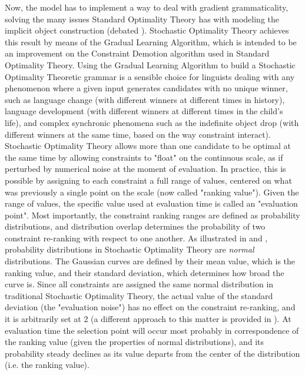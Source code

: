 Now, the model has to implement a way to deal with gradient grammaticality, solving the many issues Standard Optimality Theory has with modeling the implicit object construction (debated  ). Stochastic Optimality Theory achieves this result by means of the Gradual Learning Algorithm, which is intended to be an improvement on the Constraint Demotion algorithm \parencite{TesarSmolensky1993learnability} used in Standard Optimality Theory. Using the Gradual Learning Algorithm to build a Stochastic Optimality Theoretic grammar is a sensible choice for linguists dealing with any phenomenon where a given input generates candidates with no unique winner, such as language change (with different winners at different times in history), language development (with different winners at different times in the child's life), and complex synchronic phenomena such as the indefinite object drop (with different winners at the same time, based on the way constraint interact).\\
Stochastic Optimality Theory allows more than one candidate to be optimal at the same time by allowing constraints to "float" on the continuous scale, as if perturbed by numerical noise at the moment of evaluation. In practice, this is possible by assigning to each constraint a full range of values, centered on what was previously a single point on the scale (now called "ranking value"). Given the range of values, the specific value used at evaluation time is called an "evaluation point". Most importantly, the constraint ranking ranges are defined as probability distributions, and distribution overlap determines the probability of two constraint re-ranking with respect to one another. As illustrated in  and , probability distributions in Stochastic Optimality Theory are \textit{normal} distributions. The Gaussian curves are defined by their mean value, which is the ranking value, and their standard deviation, which determines how broad the curve is. Since all constraints are assigned the same normal distribution in traditional Stochastic Optimality Theory, the actual value of the standard deviation (the "evaluation noise") has no effect on the constraint re-ranking, and it is arbitrarily set at 2 (a different approach to this matter is provided in \textcite{reynolds1994variation, nagy1997optimality}). At evaluation time the selection point will occur most probably in correspondence of the ranking value (given the properties of normal distributions), and its probability steady declines as its value departs from the center of the distribution (i.e. the ranking value).\\
